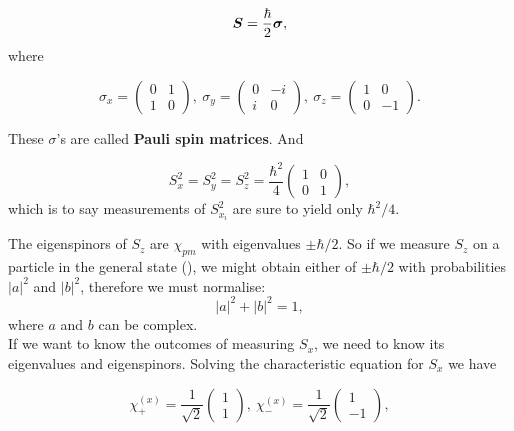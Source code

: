 \begin{prt}
\begin{equation}
\boldsymbol{S}=\frac{\hbar}{2}\boldsymbol{\sigma},
\end{equation}
where
\begin{singlespace}
\begin{equation}
\label{paulimat}
\sigma_x=
\begin{pmatrix}
0&1\\1&0
\end{pmatrix},\ 
\sigma_y=
\begin{pmatrix}
0&-i\\i&0
\end{pmatrix},\ 
\sigma_z=
\begin{pmatrix}
1&0\\0&-1
\end{pmatrix}.
\end{equation}
\end{singlespace}
These $\sigma$'s are called \textbf{Pauli spin matrices}. 
And
\begin{singlespace}
\begin{equation}S_x^2=S_y^2=S_z^2=\frac{\hbar^2}{4}
\begin{pmatrix}
1&0\\0&1
\end{pmatrix},
\end{equation}
which is to say measurements of $S_{x_i}^2$ are sure to yield only $\hbar^2/4$. 
\end{singlespace}
\end{prt}
The eigenspinors of $S_z$ are $\chi_{pm}$ with eigenvalues $\pm\hbar/2$. So if 
we measure $S_z$ on a particle in the general state (), 
we might obtain either of $\pm\hbar/2$ with probabilities $|a|^2$ and $|b|^2$, 
therefore we must normalise:
\begin{equation}
|a|^2+|b|^2=1, 
\end{equation}
where $a$ and $b$ can be complex. \\
If we want to know the outcomes of measuring $S_x$, 
we need to know its eigenvalues and eigenspinors. Solving the characteristic 
equation for $S_x$ we have
\begin{singlespace}
\begin{equation}
\chi_+^{(x)}=\frac{1}{\sqrt{2}}
\begin{pmatrix}
	1\\1
\end{pmatrix},\ 
\chi_-^{(x)}=\frac{1}{\sqrt{2}}
\begin{pmatrix}
1\\-1
\end{pmatrix}, 
\end{equation}
\end{singlespace}
